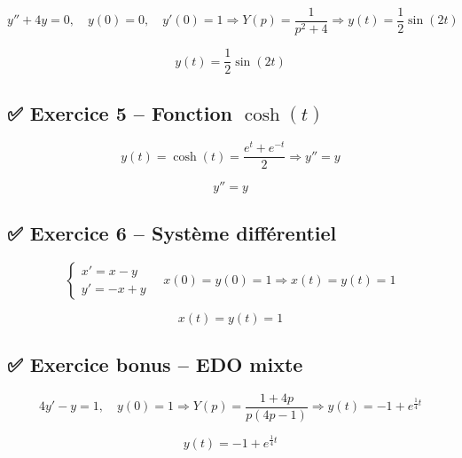 \documentclass[10pt,a4paper]{article}
\begin{document}
\begin{multicols}{2}
\[
y'' + 4y = 0,\quad y(0) = 0,\quad y'(0) = 1
\Rightarrow Y(p) = \frac{1}{p^2 + 4} 
\Rightarrow y(t) = \frac{1}{2} \sin(2t)
\]

\begin{tcolorbox}[colback=blue!5!white]
\[
\boxed{y(t) = \frac{1}{2} \sin(2t)}
\]
\end{tcolorbox}

\subsection*{✅ Exercice 5 – Fonction \( \cosh(t) \)}

\[
y(t) = \cosh(t) = \frac{e^t + e^{-t}}{2}
\Rightarrow y'' = y
\]

\begin{tcolorbox}[colback=blue!5!white]
\[
\boxed{y'' = y}
\]
\end{tcolorbox}

\subsection*{✅ Exercice 6 – Système différentiel}

\[
\begin{cases}
x' = x - y \\
y' = -x + y
\end{cases} \quad x(0) = y(0) = 1
\Rightarrow x(t) = y(t) = 1
\]

\begin{tcolorbox}[colback=blue!5!white]
\[
\boxed{x(t) = y(t) = 1}
\]
\end{tcolorbox}

\subsection*{✅ Exercice bonus – EDO mixte}

\[
4y' - y = 1,\quad y(0) = 1
\Rightarrow Y(p) = \frac{1 + 4p}{p(4p - 1)}
\Rightarrow y(t) = -1 + e^{\frac{1}{4}t}
\]

\begin{tcolorbox}[colback=blue!5!white]
\[
\boxed{y(t) = -1 + e^{\frac{1}{4}t}}
\]
\end{tcolorbox}

\end{multicols}
\end{document}
